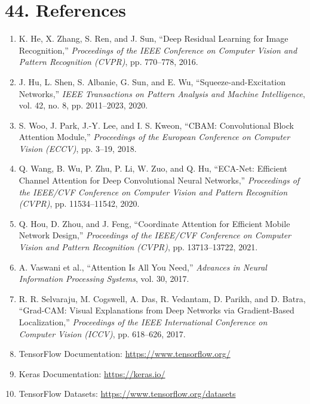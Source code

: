 \documentclass[10pt]{article}
\begin{document}
\section*{44. References}



\begin{enumerate}

\item
K. He, X. Zhang, S. Ren, and J. Sun,
``Deep Residual Learning for Image Recognition,''
\textit{Proceedings of the IEEE Conference on Computer Vision and Pattern
Recognition (CVPR)}, pp. 770--778, 2016.

\item
J. Hu, L. Shen, S. Albanie, G. Sun, and E. Wu,
``Squeeze-and-Excitation Networks,''
\textit{IEEE Transactions on Pattern Analysis and Machine Intelligence},
vol. 42, no. 8, pp. 2011--2023, 2020.

\item
S. Woo, J. Park, J.-Y. Lee, and I. S. Kweon,
``CBAM: Convolutional Block Attention Module,''
\textit{Proceedings of the European Conference on Computer Vision (ECCV)},
pp. 3--19, 2018.

\item
Q. Wang, B. Wu, P. Zhu, P. Li, W. Zuo, and Q. Hu,
``ECA-Net: Efficient Channel Attention for Deep Convolutional Neural
Networks,''
\textit{Proceedings of the IEEE/CVF Conference on Computer Vision and Pattern
Recognition (CVPR)}, pp. 11534--11542, 2020.

\item
Q. Hou, D. Zhou, and J. Feng,
``Coordinate Attention for Efficient Mobile Network Design,''
\textit{Proceedings of the IEEE/CVF Conference on Computer Vision and Pattern
Recognition (CVPR)}, pp. 13713--13722, 2021.

\item
A. Vaswani et al.,
``Attention Is All You Need,''
\textit{Advances in Neural Information Processing Systems},
vol. 30, 2017.

\item
R. R. Selvaraju, M. Cogswell, A. Das, R. Vedantam,
D. Parikh, and D. Batra,
``Grad-CAM: Visual Explanations from Deep Networks via
Gradient-Based Localization,''
\textit{Proceedings of the IEEE International Conference on Computer Vision
(ICCV)}, pp. 618--626, 2017.

\item
TensorFlow Documentation:
\url{https://www.tensorflow.org/}

\item
Keras Documentation:
\url{https://keras.io/}

\item
TensorFlow Datasets:
\url{https://www.tensorflow.org/datasets}

\end{enumerate}

\end{document}
